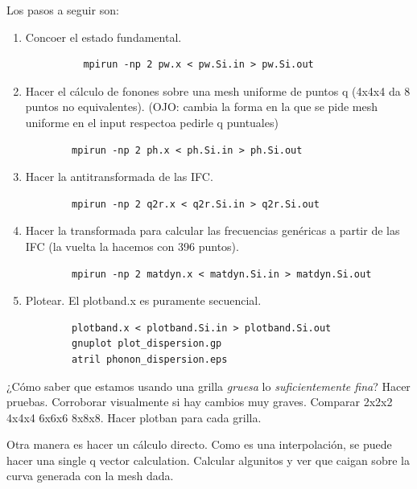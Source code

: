   Los pasos a seguir son:
    \begin{enumerate}
      \item Concoer el estado fundamental.
        \begin{verbatim}
          mpirun -np 2 pw.x < pw.Si.in > pw.Si.out
        \end{verbatim}
      \item Hacer el cálculo de fonones sobre una mesh uniforme de puntos q (4x4x4 da 8 puntos no equivalentes). (OJO: cambia la forma en la que se pide mesh uniforme en el input respectoa pedirle q puntuales)
      \begin{verbatim}
        mpirun -np 2 ph.x < ph.Si.in > ph.Si.out
      \end{verbatim}
      \item Hacer la antitransformada de las IFC.
      \begin{verbatim}
        mpirun -np 2 q2r.x < q2r.Si.in > q2r.Si.out
      \end{verbatim}
      \item Hacer la transformada para calcular las frecuencias genéricas a partir de las IFC (la vuelta la hacemos con 396 puntos).
      \begin{verbatim}
        mpirun -np 2 matdyn.x < matdyn.Si.in > matdyn.Si.out
      \end{verbatim}
      \item Plotear. El plotband.x es puramente secuencial.
      \begin{verbatim}
        plotband.x < plotband.Si.in > plotband.Si.out
        gnuplot plot_dispersion.gp
        atril phonon_dispersion.eps
      \end{verbatim}
    \end{enumerate}

  ¿Cómo saber que estamos usando una grilla \emph{gruesa} lo \emph{suficientemente fina}? Hacer pruebas. Corroborar visualmente si hay cambios muy graves. Comparar 2x2x2 4x4x4 6x6x6 8x8x8. Hacer plotban para cada grilla.

  Otra manera es hacer un cálculo directo. Como es una interpolación, se puede hacer una single q vector calculation. Calcular algunitos y ver que caigan sobre la curva generada con la mesh dada.

